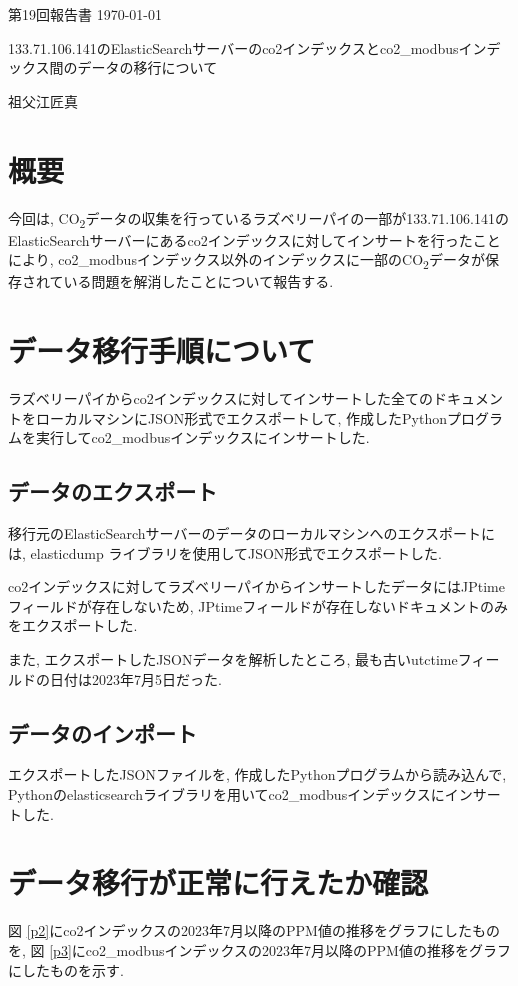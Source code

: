 \documentclass[a4j,12pt,]{jarticle}
\begin{document}
{\noindent\small 第19回報告書 \hfill\today}
\begin{center}
  {\Large 133.71.106.141のElasticSearchサーバーのco2インデックスとco2\_modbusインデックス間のデータの移行について}
\end{center}
\begin{flushright}
  祖父江匠真 \\
\end{flushright}

\section{概要}
今回は, CO\textsubscript{2}データの収集を行っているラズベリーパイの一部が133.71.106.141のElasticSearchサーバーにあるco2インデックスに対してインサートを行ったことにより, co2\_modbusインデックス以外のインデックスに一部のCO\textsubscript{2}データが保存されている問題を解消したことについて報告する.

\section{データ移行手順について}

ラズベリーパイからco2インデックスに対してインサートした全てのドキュメントをローカルマシンにJSON形式でエクスポートして, 作成したPythonプログラムを実行してco2\_modbusインデックスにインサートした.

\subsection{データのエクスポート}
移行元のElasticSearchサーバーのデータのローカルマシンへのエクスポートには, elasticdump \cite{1}ライブラリを使用してJSON形式でエクスポートした.

co2インデックスに対してラズベリーパイからインサートしたデータにはJPtimeフィールドが存在しないため, JPtimeフィールドが存在しないドキュメントのみをエクスポートした.

また, エクスポートしたJSONデータを解析したところ, 最も古いutctimeフィールドの日付は2023年7月5日だった.

\subsection{データのインポート}
エクスポートしたJSONファイルを, 作成したPythonプログラムから読み込んで, Pythonのelasticsearchライブラリを用いてco2\_modbusインデックスにインサートした.

\section{データ移行が正常に行えたか確認}
図 \ref{p2}にco2インデックスの2023年7月以降のPPM値の推移をグラフにしたものを, 図 \ref{p3}にco2\_modbusインデックスの2023年7月以降のPPM値の推移をグラフにしたものを示す.
\end{document}

